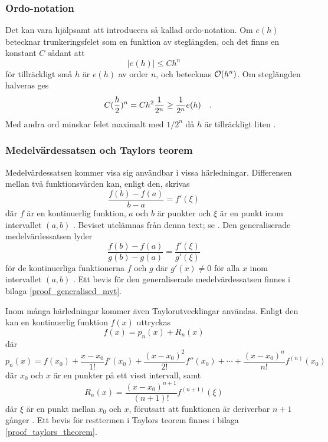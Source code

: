 \subsubsection{Ordo-notation}
Det kan vara hjälpsamt att introducera så kallad ordo-notation. Om \(e(h)\) betecknar trunkeringsfelet som en funktion av steglängden, och det finns en konstant \(C\) sådant att
\begin{equation}
    |e(h)|\leq Ch^n
\end{equation} för tillräckligt små \(h\) är \(e(h)\) av order \(n\), och betecknas \(\mathcal{O}(h^n)\). Om steglängden halveras ges
\begin{equation}\label{eq:ordo_half_h}
    C(\frac{h}{2})^n=Ch^2\frac{1}{2^n}\geq\frac{1}{2^n}e(h)
\quad\mathrm{.}\!\!\!\!\!\!\end{equation} Med andra ord minskar felet maximalt med \(1/2^n\) då \(h\) är tillräckligt liten \parencite[369-370]{zill_differential_2005}.

\subsubsection{Medelvärdessatsen och Taylors teorem}
Medelvärdessatsen kommer visa sig användbar i vissa härledningar. Differensen mellan två funktionsvärden kan, enligt den, skrivas
\begin{equation}
    \frac{f(b)-f(a)}{b-a}=f'(\xi)
\end{equation} där \(f\) är en kontinuerlig funktion, \(a\) och \(b\) är punkter och \(\xi\) är en punkt inom intervallet \((a, b)\) \parencite[235]{atkinson_numerical_2009}. Beviset utelämnas från denna text; se \textcite[141]{adams_calculus_2010}. Den generaliserade medelvärdessatsen lyder
\begin{equation}\label{eq:general_mean_value_theorem}
    \frac{f(b)-f(a)}{g(b)-g(a)}=\frac{f'(\xi)}{g'(\xi)}
\end{equation} för de kontinuerliga funktionerna \(f\) och \(g\) där \(g'(x)\neq 0\) för alla \(x\) inom intervallet \((a, b)\) \parencite[141]{adams_calculus_2010}. Ett bevis för den generaliserade medelvärdessatsen finnes i bilaga \ref{proof_generalised_mvt}.

Inom många härledningar kommer även Taylorutvecklingar användas. Enligt den kan en kontinuerlig funktion \(f(x)\) uttryckas
\begin{equation}
    f(x)=p_n(x)+R_{n}(x)
\end{equation} där
\begin{equation}
    p_n(x)=f(x_0)+\frac{x-x_0}{1!}f'(x_0)+\frac{(x-x_0)^2}{2!}f''(x_0)+\cdots+\frac{(x-x_0)^n}{n!}f^{(n)}(x_0)
\end{equation} där \(x_0\) och \(x\) är en punkter på ett visst intervall, samt
\begin{equation}
    R_{n}(x)=\frac{(x-x_0)^{n+1}}{(n+1)!}f^{(n+1)}(\xi)
\end{equation} där \(\xi\) är en punkt mellan \(x_0\) och \(x\), förutsatt att funktionen är deriverbar \(n+1\) gånger \parencite[236]{atkinson_numerical_2009}. Ett bevis för resttermen i Taylors teorem finnes i bilaga \ref{proof_taylors_theorem}.

